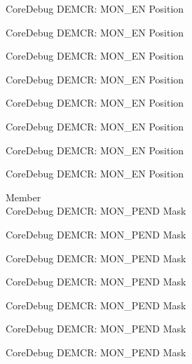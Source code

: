 \begin{DoxyRefList}
\label{deprecated__deprecated000504}%
%
Core\+Debug DEMCR\+: MON\+\_\+\+EN Position 

\label{deprecated__deprecated000606}%
%
Core\+Debug DEMCR\+: MON\+\_\+\+EN Position 

\label{deprecated__deprecated000712}%
%
Core\+Debug DEMCR\+: MON\+\_\+\+EN Position 

\label{deprecated__deprecated000856}%
%
Core\+Debug DEMCR\+: MON\+\_\+\+EN Position 

\label{deprecated__deprecated000998}%
%
Core\+Debug DEMCR\+: MON\+\_\+\+EN Position 

\label{deprecated__deprecated001074}%
%
Core\+Debug DEMCR\+: MON\+\_\+\+EN Position 

\label{deprecated__deprecated001163}%
%
Core\+Debug DEMCR\+: MON\+\_\+\+EN Position 

\label{deprecated__deprecated001265}%
%
Core\+Debug DEMCR\+: MON\+\_\+\+EN Position  
\item[Member \doxylink{group___c_m_s_i_s___core_debug_ga68ec55930269fab78e733dcfa32392f8}{Core\+Debug\+\_\+\+DEMCR\+\_\+\+MON\+\_\+\+PEND\+\_\+\+Msk} ]\hfill \\
\label{deprecated__deprecated000052}%
%
Core\+Debug DEMCR\+: MON\+\_\+\+PEND Mask 

\label{deprecated__deprecated000196}%
%
Core\+Debug DEMCR\+: MON\+\_\+\+PEND Mask 

\label{deprecated__deprecated000338}%
%
Core\+Debug DEMCR\+: MON\+\_\+\+PEND Mask 

\label{deprecated__deprecated000414}%
%
Core\+Debug DEMCR\+: MON\+\_\+\+PEND Mask 

\label{deprecated__deprecated000503}%
%
Core\+Debug DEMCR\+: MON\+\_\+\+PEND Mask 

\label{deprecated__deprecated000605}%
%
Core\+Debug DEMCR\+: MON\+\_\+\+PEND Mask 

\label{deprecated__deprecated000711}%
%
Core\+Debug DEMCR\+: MON\+\_\+\+PEND Mask 


\end{DoxyRefList}

